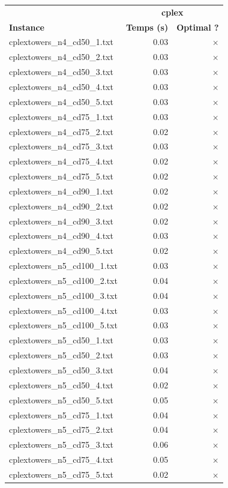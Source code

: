 \documentclass{article}
\begin{document}
\newpage
\begin{center}
\renewcommand{\arraystretch}{1.4} 
 \begin{tabular}{lrr}
	\hline
 & \multicolumn{2}{c}{\textbf{cplex}}\\
\textbf{Instance}  & \textbf{Temps (s)} & \textbf{Optimal ?} \\\hline

cplextowers\_n4\_cd50\_1.txt & 0.03 & 
$\times$
\\
cplextowers\_n4\_cd50\_2.txt & 0.03 & 
$\times$
\\
cplextowers\_n4\_cd50\_3.txt & 0.03 & 
$\times$
\\
cplextowers\_n4\_cd50\_4.txt & 0.03 & 
$\times$
\\
cplextowers\_n4\_cd50\_5.txt & 0.03 & 
$\times$
\\
cplextowers\_n4\_cd75\_1.txt & 0.03 & 
$\times$
\\
cplextowers\_n4\_cd75\_2.txt & 0.02 & 
$\times$
\\
cplextowers\_n4\_cd75\_3.txt & 0.03 & 
$\times$
\\
cplextowers\_n4\_cd75\_4.txt & 0.02 & 
$\times$
\\
cplextowers\_n4\_cd75\_5.txt & 0.02 & 
$\times$
\\
cplextowers\_n4\_cd90\_1.txt & 0.02 & 
$\times$
\\
cplextowers\_n4\_cd90\_2.txt & 0.02 & 
$\times$
\\
cplextowers\_n4\_cd90\_3.txt & 0.02 & 
$\times$
\\
cplextowers\_n4\_cd90\_4.txt & 0.03 & 
$\times$
\\
cplextowers\_n4\_cd90\_5.txt & 0.02 & 
$\times$
\\
cplextowers\_n5\_cd100\_1.txt & 0.03 & 
$\times$
\\
cplextowers\_n5\_cd100\_2.txt & 0.04 & 
$\times$
\\
cplextowers\_n5\_cd100\_3.txt & 0.04 & 
$\times$
\\
cplextowers\_n5\_cd100\_4.txt & 0.03 & 
$\times$
\\
cplextowers\_n5\_cd100\_5.txt & 0.03 & 
$\times$
\\
cplextowers\_n5\_cd50\_1.txt & 0.03 & 
$\times$
\\
cplextowers\_n5\_cd50\_2.txt & 0.03 & 
$\times$
\\
cplextowers\_n5\_cd50\_3.txt & 0.04 & 
$\times$
\\
cplextowers\_n5\_cd50\_4.txt & 0.02 & 
$\times$
\\
cplextowers\_n5\_cd50\_5.txt & 0.05 & 
$\times$
\\
cplextowers\_n5\_cd75\_1.txt & 0.04 & 
$\times$
\\
cplextowers\_n5\_cd75\_2.txt & 0.04 & 
$\times$
\\
cplextowers\_n5\_cd75\_3.txt & 0.06 & 
$\times$
\\
cplextowers\_n5\_cd75\_4.txt & 0.05 & 
$\times$
\\
cplextowers\_n5\_cd75\_5.txt & 0.02 & 
$\times$
\\
\hline\end{tabular}
\end{center}
\end{document}
